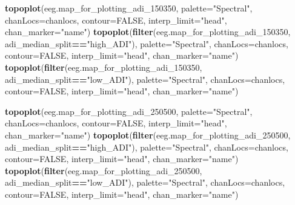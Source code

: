 \documentclass[
]{article}
\newenvironment{Shaded}{\begin{snugshade}}{\end{snugshade}}
\newcommand{\AttributeTok}[1]{\textcolor[rgb]{0.13,0.29,0.53}{#1}}
\newcommand{\ConstantTok}[1]{\textcolor[rgb]{0.56,0.35,0.01}{#1}}
\newcommand{\FunctionTok}[1]{\textcolor[rgb]{0.13,0.29,0.53}{\textbf{#1}}}
\newcommand{\NormalTok}[1]{#1}
\newcommand{\SpecialCharTok}[1]{\textcolor[rgb]{0.81,0.36,0.00}{\textbf{#1}}}
\newcommand{\StringTok}[1]{\textcolor[rgb]{0.31,0.60,0.02}{#1}}
\begin{document}
\begin{Shaded}
\begin{Highlighting}[]
\FunctionTok{topoplot}\NormalTok{(eeg.map\_for\_plotting\_adi\_150350, }\AttributeTok{palette=}\StringTok{"Spectral"}\NormalTok{, }\AttributeTok{chanLocs=}\NormalTok{chanlocs, }\AttributeTok{contour=}\ConstantTok{FALSE}\NormalTok{, }\AttributeTok{interp\_limit=}\StringTok{"head"}\NormalTok{, }\AttributeTok{chan\_marker=}\StringTok{"name"}\NormalTok{)}
\FunctionTok{topoplot}\NormalTok{(}\FunctionTok{filter}\NormalTok{(eeg.map\_for\_plotting\_adi\_150350, adi\_median\_split}\SpecialCharTok{==}\StringTok{"high\_ADI"}\NormalTok{), }\AttributeTok{palette=}\StringTok{"Spectral"}\NormalTok{, }\AttributeTok{chanLocs=}\NormalTok{chanlocs, }\AttributeTok{contour=}\ConstantTok{FALSE}\NormalTok{, }\AttributeTok{interp\_limit=}\StringTok{"head"}\NormalTok{, }\AttributeTok{chan\_marker=}\StringTok{"name"}\NormalTok{)}
\FunctionTok{topoplot}\NormalTok{(}\FunctionTok{filter}\NormalTok{(eeg.map\_for\_plotting\_adi\_150350, adi\_median\_split}\SpecialCharTok{==}\StringTok{"low\_ADI"}\NormalTok{), }\AttributeTok{palette=}\StringTok{"Spectral"}\NormalTok{, }\AttributeTok{chanLocs=}\NormalTok{chanlocs, }\AttributeTok{contour=}\ConstantTok{FALSE}\NormalTok{, }\AttributeTok{interp\_limit=}\StringTok{"head"}\NormalTok{, }\AttributeTok{chan\_marker=}\StringTok{"name"}\NormalTok{)}


\FunctionTok{topoplot}\NormalTok{(eeg.map\_for\_plotting\_adi\_250500, }\AttributeTok{palette=}\StringTok{"Spectral"}\NormalTok{, }\AttributeTok{chanLocs=}\NormalTok{chanlocs, }\AttributeTok{contour=}\ConstantTok{FALSE}\NormalTok{, }\AttributeTok{interp\_limit=}\StringTok{"head"}\NormalTok{, }\AttributeTok{chan\_marker=}\StringTok{"name"}\NormalTok{)}
\FunctionTok{topoplot}\NormalTok{(}\FunctionTok{filter}\NormalTok{(eeg.map\_for\_plotting\_adi\_250500, adi\_median\_split}\SpecialCharTok{==}\StringTok{"high\_ADI"}\NormalTok{), }\AttributeTok{palette=}\StringTok{"Spectral"}\NormalTok{, }\AttributeTok{chanLocs=}\NormalTok{chanlocs, }\AttributeTok{contour=}\ConstantTok{FALSE}\NormalTok{, }\AttributeTok{interp\_limit=}\StringTok{"head"}\NormalTok{, }\AttributeTok{chan\_marker=}\StringTok{"name"}\NormalTok{)}
\FunctionTok{topoplot}\NormalTok{(}\FunctionTok{filter}\NormalTok{(eeg.map\_for\_plotting\_adi\_250500, adi\_median\_split}\SpecialCharTok{==}\StringTok{"low\_ADI"}\NormalTok{), }\AttributeTok{palette=}\StringTok{"Spectral"}\NormalTok{, }\AttributeTok{chanLocs=}\NormalTok{chanlocs, }\AttributeTok{contour=}\ConstantTok{FALSE}\NormalTok{, }\AttributeTok{interp\_limit=}\StringTok{"head"}\NormalTok{, }\AttributeTok{chan\_marker=}\StringTok{"name"}\NormalTok{)}


\end{Highlighting}
\end{Shaded}
\end{document}
